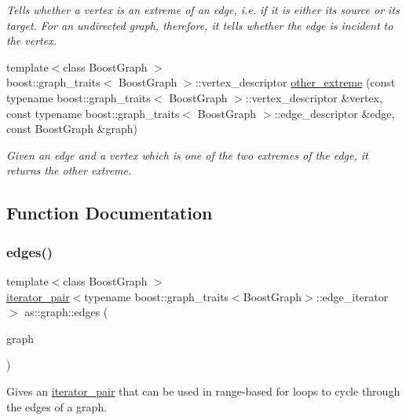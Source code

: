 \begin{DoxyCompactItemize}
\begin{DoxyCompactList}\small\item\em Tells whether a vertex is an extreme of an edge, i.\+e. if it is either its source or its target. For an undirected graph, therefore, it tells whether the edge is incident to the vertex. \end{DoxyCompactList}\item 
{\footnotesize template$<$class Boost\+Graph $>$ }\\boost\+::graph\+\_\+traits$<$ Boost\+Graph $>$\+::vertex\+\_\+descriptor \hyperlink{namespaceas_1_1graph_a592c192d63c1c42820da78708adb9e61}{other\+\_\+extreme} (const typename boost\+::graph\+\_\+traits$<$ Boost\+Graph $>$\+::vertex\+\_\+descriptor \&vertex, const typename boost\+::graph\+\_\+traits$<$ Boost\+Graph $>$\+::edge\+\_\+descriptor \&edge, const Boost\+Graph \&graph)
\begin{DoxyCompactList}\small\item\em Given an edge and a vertex which is one of the two extremes of the edge, it returns the other extreme. \end{DoxyCompactList}\end{DoxyCompactItemize}


\subsection{Function Documentation}
\mbox{\label{namespaceas_1_1graph_ae44b728c4acaf47bc2bb010831df9452}} 
\subsubsection{\texorpdfstring{edges()}{edges()}}
{\footnotesize\ttfamily template$<$class Boost\+Graph $>$ \\
\hyperlink{classas_1_1iterator__pair}{iterator\+\_\+pair}$<$typename boost\+::graph\+\_\+traits$<$Boost\+Graph$>$\+::edge\+\_\+iterator$>$ as\+::graph\+::edges (\begin{DoxyParamCaption}\item[{const Boost\+Graph \&}]{graph }\end{DoxyParamCaption})\hspace{0.3cm}{\ttfamily [inline]}}



Gives an \hyperlink{classas_1_1iterator__pair}{iterator\+\_\+pair} that can be used in range-\/based for loops to cycle through the edges of a graph. 


